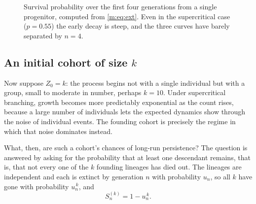 \begin{figure}[ht]
\centering
\caption{Survival probability over the first four generations from a single
progenitor, computed from \cref{m:eq:ext}. Even in the supercritical case
($p=0.55$) the early decay is steep, and the three curves have barely separated by
$n=4$.}
\label{m:fig:earlySn}
\end{figure}

\subsection{An initial cohort of size \texorpdfstring{$k$}{k}}
\label{m:sec:cohort}

Now suppose $Z_0=k$: the process begins not with a single individual but with a
group, small to moderate in number, perhaps $k=10$. Under supercritical branching,
growth becomes more predictably exponential as the count rises, because a large
number of individuals lets the expected dynamics show through the noise of
individual events. The founding cohort is precisely the regime in which that noise
dominates instead.

What, then, are such a cohort's chances of long-run persistence? The question is
answered by asking for the probability that at least one descendant remains, that
is, that not every one of the $k$ founding lineages has died out. The lineages are
independent and each is extinct by generation $n$ with probability $u_n$, so all
$k$ have gone with probability $u_n^{\,k}$, and
\begin{equation}
\label{m:eq:Snk}
S^{(k)}_n = 1-u_n^{\,k} .
\end{equation}

